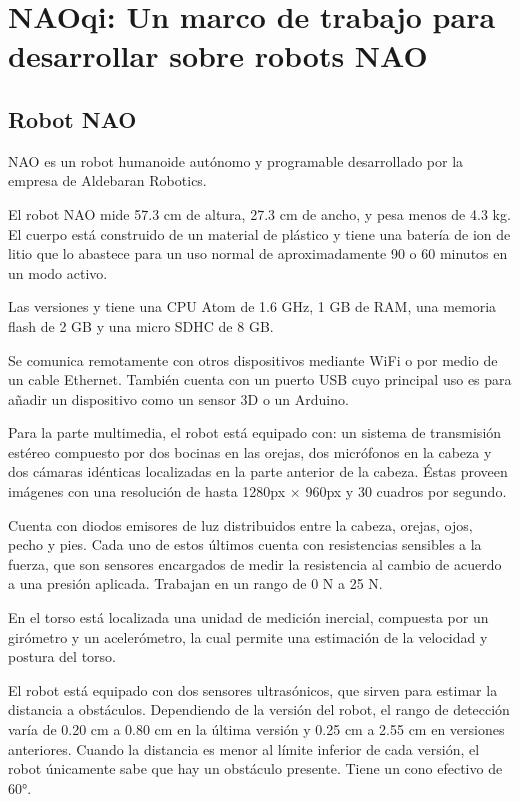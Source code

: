 \section{NAOqi: Un marco de trabajo para desarrollar sobre robots NAO}
\label{\detokenize{chapter_one/naoqi:naoqi-un-marco-de-trabajo-para-desarrollar-sobre-robots-nao}}\label{\detokenize{chapter_one/naoqi::doc}}


\subsection{Robot NAO}
\label{\detokenize{chapter_one/naoqi:nao}}
NAO es un robot humanoide autónomo y programable desarrollado por la empresa de
Aldebaran Robotics.

El robot NAO mide 57.3 cm de altura, 27.3 cm de ancho, y pesa menos de 4.3 kg.
El cuerpo está construido de un material de plástico y tiene una batería de ion
de litio que lo abastece para un uso normal de aproximadamente
90 o 60 minutos en un modo activo.

Las versiones  y  tiene una CPU Atom de 1.6 GHz, 1 GB de RAM, una
memoria flash de 2 GB y una micro SDHC de 8 GB.

Se comunica remotamente con otros dispositivos mediante WiFi o por medio de un
cable Ethernet. También cuenta con un puerto USB cuyo principal uso es para
añadir un dispositivo como un sensor 3D o un Arduino.

Para la parte multimedia, el robot está equipado con: un sistema de transmisión
estéreo compuesto por dos bocinas en las orejas, dos micrófonos en la cabeza
y dos cámaras idénticas
localizadas en la parte anterior de la cabeza. Éstas proveen imágenes con una
resolución de hasta 1280px $\times$ 960px y 30 cuadros por segundo.

Cuenta con diodos emisores de luz distribuidos entre la cabeza, orejas, ojos, pecho y pies. Cada
uno de estos últimos cuenta con resistencias sensibles a la fuerza, que son
sensores encargados de medir la resistencia al cambio de acuerdo a una presión
aplicada. Trabajan en un rango de 0 N a 25 N.

En el torso está localizada una unidad de medición inercial, compuesta por un
girómetro y un acelerómetro, la cual permite una estimación de la velocidad
y postura del torso.

El robot está equipado con dos sensores ultrasónicos, que sirven para estimar
la distancia a obstáculos. Dependiendo de la versión del robot, el rango de
detección varía de 0.20 cm a 0.80 cm en la última versión y 0.25 cm a 2.55 cm
en versiones anteriores. Cuando la distancia es menor al límite inferior de
cada versión, el robot únicamente sabe que hay un obstáculo presente.
Tiene un cono efectivo de 60°.

